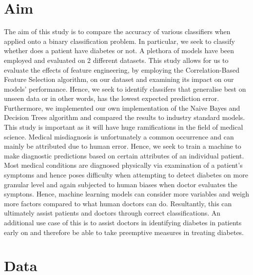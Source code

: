 \documentclass[12pt]{article}
\begin{document}
\section*{Aim}
The aim of this study is to compare the accuracy of various classifiers when applied onto a binary classification problem. In particular, we seek to classify whether does a patient have diabetes or not. A plethora of models have been employed and evaluated on 2 different datasets. This study allows for us to evaluate the effects of feature engineering, by employing the Correlation-Based Feature Selection algorithm, on our dataset and examining its impact on our models' performance.  Hence, we seek to identify classifers that generalise best on unseen data or in other words, has the lowest expected prediction error. Furthermore, we implemented our own implementation of the Naive Bayes and Decision Trees algorithm and compared the results to industry standard models.\\

This study is important as it will have huge ramifications in the field of medical science. Medical misdiagnosis is unfortunately a common occurrence and can mainly be attributed due to human error. Hence, we seek to train a machine to make diagnostic predictions based on certain attributes of an individual patient. Most medical conditions are diagnosed physically via examination of a patient’s symptoms and hence poses difficulty when attempting to detect diabetes on more granular level and again subjected to human biases when doctor evaluates the symptons. Hence, machine learning models can consider more variables and weigh more factors compared to what human doctors can do. Resultantly, this can ultimately assist patients and doctors through correct classifications. An additional use case of this is to assist doctors in identifying diabetes in patients early on and therefore be able to take preemptive measures in treating diabetes.

\newpage{}


{}
\section*{Data}
\end{document}

